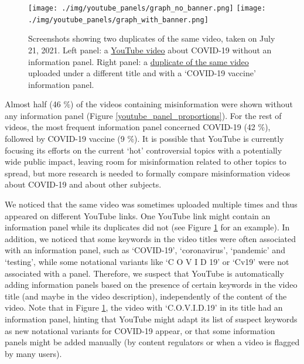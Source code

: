 \documentclass{article}
\begin{document}
\begin{figure}[h]
	\centering
		\begin{multicols}{1}
		\texttt{[image: ./img/youtube\_panels/graph\_no\_banner.png]}
		\texttt{[image: ./img/youtube\_panels/graph\_with\_banner.png]} 
		\end{multicols}
	\caption{Screenshots showing two duplicates of the same video, taken on July 21, 2021. 
Left panel: a \href{https://www.youtube.com/watch?v=d9GbVZOcT18}{YouTube video} about COVID-19 without an information panel. 	
Right panel: a \href{https://www.youtube.com/watch?v=A4RvrEKoNxc}{duplicate of the same video} uploaded under a different title and with a `COVID-19 vaccine' information panel.}
	\label{duplicates_yt}
\end{figure}

\smallskip

Almost half (46 \%) of the videos containing misinformation were shown without any information panel (Figure \ref{youtube_panel_proportions}).
For the rest of videos, the most frequent information panel concerned COVID-19 (42 \%), followed by COVID-19 vaccine (9 \%).
It is possible that YouTube is currently focusing its efforts on the current `hot' controversial topics with a potentially wide public impact, leaving room for misinformation related to other topics to spread, but more research is needed to formally compare misinformation videos about COVID-19 and about other subjects.
\smallskip

We noticed that the same video was sometimes uploaded multiple times and thus appeared on different YouTube links. 
One YouTube link might contain an information panel while its duplicates did not (see Figure \ref{duplicates_yt} for an example).  
In addition, we noticed that some keywords in the video titles were often associated with an information panel, such as `COVID-19', `coronavirus', `pandemic' and `testing', while some notational variants like `C O V I D 19' or `Cv19' were not associated with a panel.
Therefore, we suspect that YouTube is automatically adding information panels based on the presence of certain keywords in the video title (and maybe in the video description), independently of the content of the video.
Note that in Figure \ref{duplicates_yt}, the video with `C.O.V.I.D.19' in its title had an information panel, hinting that YouTube might adapt its list of suspect keywords as new notational variants for COVID-19 appear, or that some information panels might be added manually (by content regulators or when a video is flagged by many users).
\end{document}

